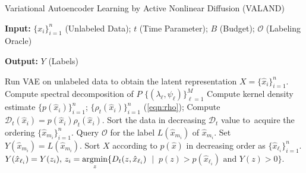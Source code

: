 \documentclass{article}
\newcommand{\argmin}{\operatornamewithlimits{argmin}}%
\def\hx{{\hat x}}
\newcommand{\Dt}{\mathcal{D}_{t}}
\begin{document}
\begin{algorithm}[!htb]
	\caption{\label{alg:VALAND}Variational Autoencoder Learning by Active Nonlinear Diffusion (VALAND)}
	\flushleft
	\flushleft
	\textbf{Input:} $\{x_{i}\}_{i=1}^{n}$ (Unlabeled Data);  $t$ (Time Parameter); $B$ (Budget); $\mathcal{O}$ (Labeling Oracle)
	
	\vspace{3pt}
	
	\textbf{Output:} $Y$ (Labels)
	
		\vspace{3pt}


	\begin{algorithmic}[1]
	\STATE Run VAE on unlabeled data to obtain  the latent representation $X = \{\hx_{i}\}_{i=1}^{n}$.  
\STATE Compute  spectral decomposition of $P$ $\{(\lambda_{\ell},\psi_{\ell})\}_{\ell=1}^{M}$
\STATE Compute kernel density estimate $\{p(\hx_{i})\}_{i=1}^{n}$;  $\{\rho_{t}(\hx_{i})\}_{i=1}^{n}$ (\ref{eqn:rho});
	\STATE Compute $\Dt(\hx_{i})=p(\hx_{i})\rho_{t}(\hx_{i})$.  
	\STATE Sort the data in decreasing $\Dt$ value to\ 
	acquire the ordering $\{\hx_{m_{i}}\}_{i=1}^{n}$.
	\STATE Query $\mathcal{O}$ for the label $L(\hx_{m_{i}})$ of $\hx_{m_{i}}$.
	\STATE Set $Y(\hx_{m_{i}})=L(\hx_{m_{i}})$.
	\ENDFOR
	\STATE Sort $X$ according to $p(\hx)$ in decreasing order as $\{\hx_{\ell_{i}}\}_{i=1}^{n}$.  
	\FOR{$i=1:n$}
	\IF{$Y(\hx_{\ell_{i}})=0$}
	\STATE $Y(\hx_{\ell_{i}})=Y(z_{i}), \, z_{i}=\displaystyle\argmin_{z}\{D_{t}(z,\hx_{\ell_{i}})$\ $| \ $ $p(z)>p(\hx_{\ell_{i}}) \text{ and } Y(z)>0\}$.
	\ENDIF
	\ENDFOR
	\end{algorithmic}
\end{algorithm}
\end{document}
